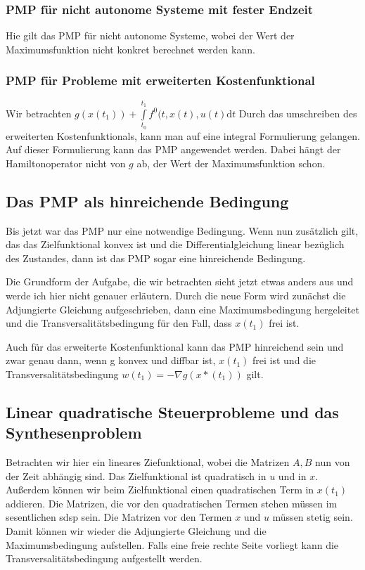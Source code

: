 \documentclass[pdftex,a4paper,oneside]{scrbook}
\begin{document}
\subsubsection*{PMP für nicht autonome Systeme mit fester Endzeit}
Hie gilt das PMP für nicht autonome Systeme, wobei der Wert der Maximumsfunktion nicht konkret berechnet werden kann. 

\subsubsection*{PMP für Probleme mit erweiterten Kostenfunktional}
Wir betrachten $g(x(t_1)) + \int\limits_{t_0}^{t_1} f^0(t,x(t), u(t) \mathrm{d}t$
Durch das umschreiben des erweiterten Kostenfunktionals, kann man auf eine integral Formulierung gelangen. Auf dieser Formulierung kann das PMP angewendet werden. Dabei hängt der Hamiltonoperator nicht von $g$ ab, der Wert der Maximumsfunktion schon. 

\subsection{Das PMP als hinreichende Bedingung}

Bis jetzt war das PMP nur eine notwendige Bedingung. Wenn nun zusätzlich gilt, das das Zielfunktional konvex ist und die Differentialgleichung linear bezüglich des Zustandes, dann ist das PMP sogar eine hinreichende Bedingung. 

Die Grundform der Aufgabe, die wir betrachten sieht jetzt etwas anders aus und werde ich hier nicht genauer erläutern. Durch die neue Form wird zunächst die Adjungierte Gleichung aufgeschrieben, dann eine Maximumsbedingung hergeleitet und die Transversalitätsbedingung für den Fall, dass $x(t_1)$ frei ist. 

Auch für das erweiterte Kostenfunktional kann das PMP hinreichend sein und zwar genau dann, wenn g konvex und diffbar ist, $x(t_1)$ frei ist und die Transversalitätsbedingung $ w(t_1)= - \nabla g(x*(t_1)) $ gilt. 

\subsection{Linear quadratische Steuerprobleme und das Synthesenproblem}
Betrachten wir hier ein lineares Ziefunktional, wobei die Matrizen $A, B$ nun von der Zeit abhängig sind. Das Zielfunktional ist quadratisch in $ u$ und in $x$. Außerdem können wir beim Zielfunktional einen quadratischen Term in $x(t_1)$ addieren. Die Matrizen, die vor den quadratischen Termen stehen müssen im sesentlichen sdsp sein. Die Matrizen vor den Termen $x$ und $u$ müssen stetig sein. Damit können wir wieder die Adjungierte Gleichung und die Maximumsbedingung aufstellen. Falls eine freie rechte Seite vorliegt kann die Transversalitätsbedingung aufgestellt werden.   
\end{document}
